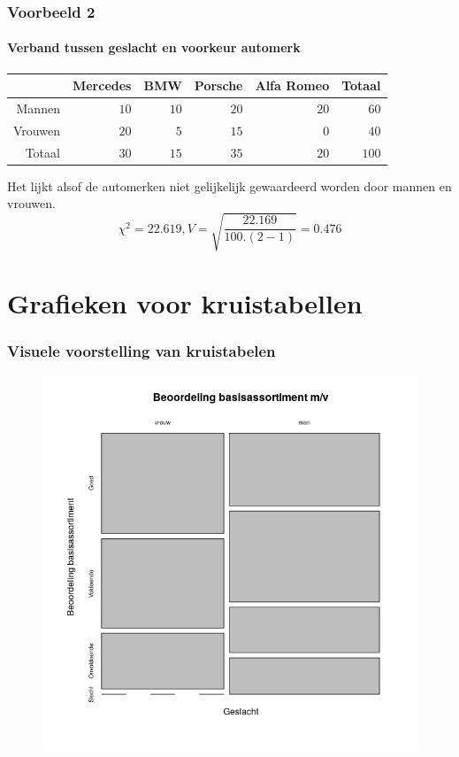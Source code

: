 \documentclass[aspectratio=169]{beamer}
\begin{document}
\begin{frame}
  \frametitle{Voorbeeld 2}
  \framesubtitle{Verband tussen geslacht en voorkeur automerk}
  
  \begin{table}[h] \centering
    \begin{tabular}{@{}rrrrrr@{}} \toprule
      & Mercedes & BMW & Porsche& Alfa Romeo & Totaal \\
      \midrule
      Mannen  & $10$ & $10$ & $20$ & $20$ & $60$ \\
      Vrouwen & $20$ & $5$  & $15$ & $0$  & $40$ \\
      Totaal  & $30$ & $15$ & $35$ & $20$ & $100$ \\
      \bottomrule
    \end{tabular}
  \end{table}
  Het lijkt alsof de automerken niet gelijkelijk gewaardeerd worden door mannen en vrouwen.
  \[ \chi^{2} = 22.619, V = \sqrt{\frac{22.169}{100 . (2-1)}}  = 0.476\]
\end{frame}

\section{Grafieken voor kruistabellen}

\begin{frame}
  \frametitle{Visuele voorstelling van kruistabelen}
  
  \begin{figure}
    \centering
    \includegraphics[height=.9\textheight]{img/2var-xtab-plot-waardering}
  \end{figure}
  
\end{frame}
\end{document}

